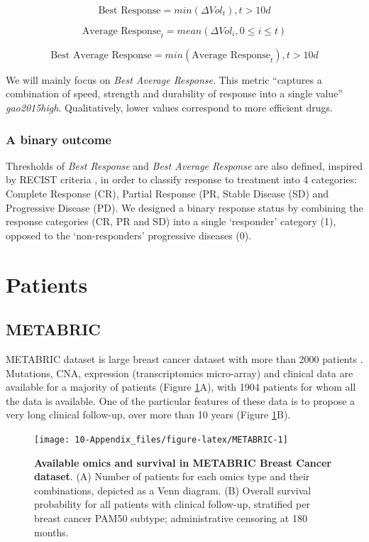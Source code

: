 \documentclass[a4paper,12pt,twoside,onecolumn,openright,final,oldfontcommands]{memoir}
\begin{document}
\[\text{Best Response} = min(\Delta Vol_t), t>10d\]

\[\text{Average Response}_t = mean(\Delta Vol_i, 0 \leq i\leq t)\]

\[\text{Best Average Response} = min(\text{Average Response}_t), t>10d\]

We will mainly focus on \emph{Best Average Response}. This metric
``captures a combination of speed, strength and durability of response
into a single value'' \emph{gao2015high}. Qualitatively, lower values
correspond to more efficient drugs.

\subsubsection{A binary outcome}\label{a-binary-outcome}

Thresholds of \emph{Best Response} and \emph{Best Average Response} are
also defined, inspired by RECIST criteria \citep{therasse2000new}, in
order to classify response to treatment into 4 categories: Complete
Response (CR), Partial Response (PR, Stable Disease (SD) and Progressive
Disease (PD). We designed a binary response status by combining the
response categories (CR, PR and SD) into a single `responder' category
(1), opposed to the `non-responders' progressive diseases (0).

\section{Patients}\label{appendix-datasets-patients}

\subsection{METABRIC}\label{metabric}

METABRIC dataset is large breast cancer dataset with more than 2000
patients \citep{pereira2016somatic}. Mutations, CNA, expression
(transcriptomics micro-array) and clinical data are available for a
majority of patients (Figure \ref{fig:METABRIC}A), with 1904 patients
for whom all the data is available. One of the particular features of
these data is to propose a very long clinical follow-up, over more than
10 years (Figure \ref{fig:METABRIC}B).

\begin{figure}

{\centering \texttt{[image: 10-Appendix\_files/figure-latex/METABRIC-1]} 

}

\caption[Available omics and survival in METABRIC Breast Cancer dataset]{\textbf{Available omics and survival in METABRIC
Breast Cancer dataset}. (A) Number of patients for each omics type and
their combinations, depicted as a Venn diagram. (B) Overall survival
probability for all patients with clinical follow-up, stratified per
breast cancer PAM50 subtype; administrative censoring at 180 months.}\label{fig:METABRIC}
\end{figure}
\end{document}
